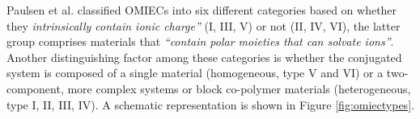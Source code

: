 Paulsen et al. classified OMIECs into six different categories based on whether they \textit{intrinsically contain ionic charge''} (I, III, V) or not (II, IV, VI), the latter group comprises materials that \textit{``contain polar moieties that can solvate ions''}. Another distinguishing factor among these categories is whether the conjugated system is composed of a single material (homogeneous, type V and VI) or a two-component, more complex systems or block co-polymer materials (heterogeneous, type I, II, III, IV)\cite{paulsenOrganicMixedIonic2020}. A schematic representation is shown in Figure \ref{fig:omiectypes}. %



